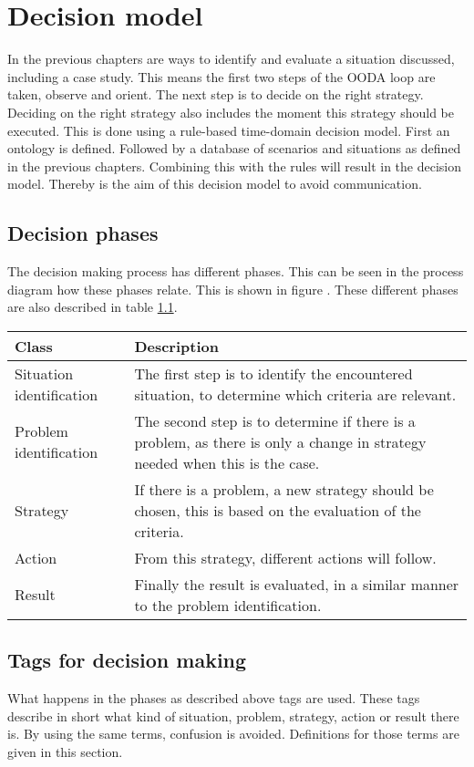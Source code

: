\chapter{Decision model}
In the previous chapters are ways to identify and evaluate a situation discussed, including a case study. This means the first two steps of the OODA loop are taken, observe and orient. The next step is to decide on the right strategy. Deciding on the right strategy also includes the moment this strategy should be executed. 
This is done using a rule-based time-domain decision model. First an ontology is defined. Followed by a database of scenarios and situations as defined in the previous chapters. Combining this with the rules will result in the decision model. Thereby is the aim of this decision model to avoid communication.

\section{Decision phases}
The decision making process has different phases. This can be seen in the process diagram how these phases relate. This is shown in figure . These different phases are also described in table \ref{tab:phases-description}.
\begin{table}[H]
	\begin{tabular}{p{}|p{}}
		\toprule
		Class & Description\\
		\midrule
		Situation identification & The first step is to identify the encountered situation, to determine which criteria are relevant. \\
		Problem identification & The second step is to determine if there is a problem, as there is only a change in strategy needed when this is the case. \\
		Strategy & If there is a problem, a new strategy should be chosen, this is based on the evaluation of the criteria. \\
		Action & From this strategy, different actions will follow. \\
		Result & Finally the result is evaluated, in a similar manner to the problem identification. \\
		\bottomrule
	\end{tabular}
	
	\label{tab:phases-description}
\end{table}

\section{Tags for decision making}
What happens in the phases as described above tags are used. These tags describe in short what kind of situation, problem, strategy, action or result there is. By using the same terms, confusion is avoided. Definitions for those terms are given in this section.

